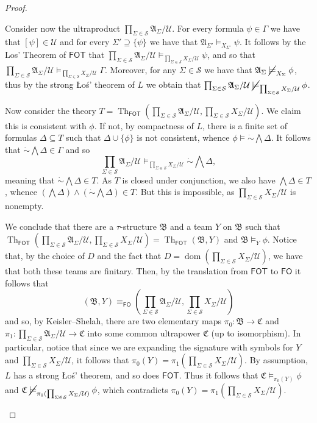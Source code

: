 \documentclass[a4paper]{amsart}
\theoremstyle{definition}
\theoremstyle{remark}
\newcommand{\A}{\mathcal{A}}
\newcommand{\B}{\mathcal{B}}
\newcommand{\C}{\mathcal{C}}
\newcommand{\U}{\mathcal{U}}
\renewcommand{\S}{\mathcal{S}}
\DeclareMathOperator{\dom}{dom}
\newcommand{\cneg}{\mathord{\dot{\sim}}}
\newcommand\fol{\mathsf{FO}}
\newcommand\fot{\mathsf{FOT}}
\newcommand\nmodels{\mathbin{\cancel{\models}}}
\theoremstyle{definition}
\renewcommand{\A}{\mathfrak{A}}
\renewcommand{\B}{\mathfrak{B}}
\renewcommand{\C}{\mathfrak{C}}
\DeclareMathOperator{\Th}{Th}
\begin{document}
\begin{proof}
\begin{enumerate}
        Consider now the ultraproduct $\prod_{\Sigma\in\S}\A_\Sigma/\U$. For every formula $\psi\in  \Gamma$ we have that $[\psi]\in \U$ and for every $\Sigma'\supseteq \{\psi \}$ we have  that $\A_{\Sigma'}\models_{X_{\Sigma'}} \psi$. It follows by the Los' Theorem of $\fot$ that $\prod_{\Sigma\in\S}\A_\Sigma/\U\models_{\prod_{\Sigma\in\S}X_\Sigma/\U} \psi$, and so that $\prod_{\Sigma\in\S}\A_\Sigma/\U\models_{\prod_{\Sigma\in\S}X_\Sigma/\U} \Gamma$. Moreover, for any $\Sigma\in\S$ we have that $\A_\Sigma\nmodels_{X_{\Sigma}}  \phi$, thus by the strong Łoś' theorem  of $L$  we obtain that $\prod_{\Sigma\in\S}\A_\Sigma/\U\nmodels_{\prod_{\Sigma\in\S}X_\Sigma/\U} \phi $.

        Now consider the theory $T= \Th_\fot(\prod_{\Sigma\in\S}\A_\Sigma/\U,\prod_{\Sigma\in\S}X_\Sigma/\U)$. We claim this is consistent with $\phi$. If not, by compactness of $L$, there is a finite set of formulas  $\Delta\subseteq T$ such that $\Delta\cup \{\phi\}$ is not consistent, whence $\phi\models\cneg\bigwedge\Delta$. It follows that $\cneg\bigwedge\Delta \in \Gamma$ and so
        \[
            \prod_{\Sigma\in\S}\A_\Sigma/\U\models_{\prod_{\Sigma\in\S}X_\Sigma/\U} \cneg\bigwedge\Delta,
        \]
        meaning that $\cneg\bigwedge\Delta\in T$. As $T$ is closed under conjunction, we also have $\bigwedge\Delta\in T$, whence $(\bigwedge\Delta)\land(\cneg\bigwedge\Delta)\in T$. But this is impossible, as $\prod_{\Sigma\in\S}X_\Sigma/\U$ is nonempty.
        
        We conclude that there are a $\tau$-structure $\B$ and a team $Y$ on $\B$ such that $\Th_\fot(\prod_{\Sigma\in\S}\A_\Sigma/\U,\prod_{\Sigma\in\S}X_\Sigma/\U)=    \Th_\fot(\B,Y)$ and $\B\models_{Y}\phi$. Notice that, by the choice of $D$ and the fact that $D=\dom(\prod_{\Sigma\in\S}X_\Sigma/\U)$, we have that both these teams are finitary. Then, by the translation from $\fot$ to $\fol$ it follows that
        \[
            (\B,Y) \equiv_\fol \left(\prod_{\Sigma\in\S}\A_\Sigma/\U, \prod_{\Sigma\in\S}X_\Sigma/\U\right)
        \]
        and so, by Keisler--Shelah, there are two elementary maps $\pi_0\colon\B\to\C$ and $\pi_1\colon\prod_{\Sigma\in\S}\A_\Sigma/\U\to \C $ into some common ultrapower $\C$ (up to isomorphism). In particular, notice that since we are expanding the signature with symbols for $Y$ and $\prod_{\Sigma\in\S}X_\Sigma/\U$, it follows that $\pi_0(Y)=\pi_1(\prod_{\Sigma\in\S}X_\Sigma/\U)$. By assumption, $L$ has a strong Łoś' theorem, and so does $\fot$. Thus it follows that $\C\models_{\pi_0(Y)}\phi$ and $\C\nmodels_{\pi_1(\prod_{\Sigma\in\S}X_\Sigma/\U)}\phi$, which contradicts $\pi_0(Y)=\pi_1(\prod_{\Sigma\in\S}X_\Sigma/\U)$.  \qedhere
    \end{enumerate}
\end{proof}
\end{document}
